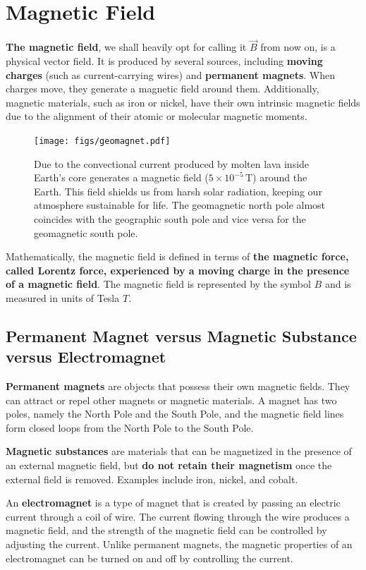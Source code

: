 \documentclass[12pt,b4paper]{article}
\begin{document}
\section{Magnetic Field}
\thispagestyle{empty}
\textbf{The magnetic field}, we shall heavily opt for calling it $\vec{B}$ from now on, is a physical vector field. It is produced by several sources, including \textbf{moving charges} (such as current-carrying wires) and \textbf{permanent magnets}. When charges move, they generate a magnetic field around them. Additionally, magnetic materials, such as iron or nickel, have their own intrinsic magnetic fields due to the alignment of their atomic or molecular magnetic moments.
\begin{figure}[H]
    \centering
    \texttt{[image: figs/geomagnet.pdf]}
    \caption{Due to the convectional current produced by molten lava inside Earth's core generates a magnetic field ($5\times10^{-5}\,\unit{\tesla}$) around the Earth. This field shields us from harsh solar radiation, keeping our atmosphere sustainable for life. The geomagnetic north pole almost coincides with the geographic south pole and vice versa for the geomagnetic south pole.}
    \label{fig:geomagnet}
\end{figure}
Mathematically, the magnetic field is defined in terms of \textbf{the magnetic force, called Lorentz force, experienced by a moving charge in the presence of a magnetic field}. The magnetic field is represented by the symbol $B$ and is measured in units of Tesla $T$.
\subsection{Permanent Magnet versus Magnetic Substance versus Electromagnet}
\textbf{Permanent magnets} are objects that possess their own magnetic fields. They can attract or repel other magnets or magnetic materials. A magnet has two poles, namely the North Pole and the South Pole, and the magnetic field lines form closed loops from the North Pole to the South Pole.

\textbf{Magnetic substances} are materials that can be magnetized in the presence of an external magnetic field, but \textbf{do not retain their magnetism} once the external field is removed. Examples include iron, nickel, and cobalt.

An \textbf{electromagnet} is a type of magnet that is created by passing an electric current through a coil of wire. The current flowing through the wire produces a magnetic field, and the strength of the magnetic field can be controlled by adjusting the current. Unlike permanent magnets, the magnetic properties of an electromagnet can be turned on and off by controlling the current.
\end{document}

